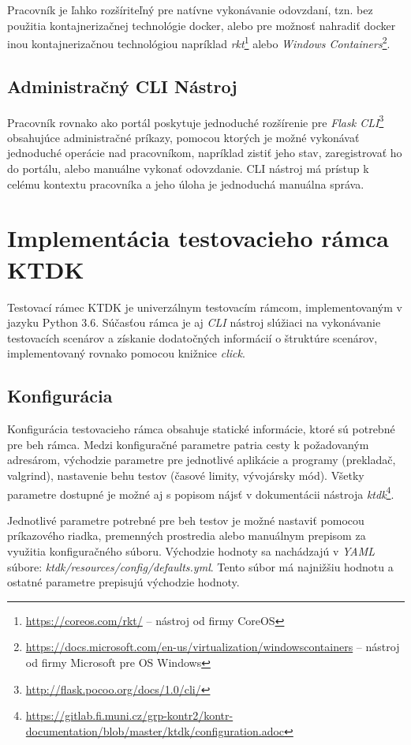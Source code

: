 \documentclass[
  digital, %
  twoside, %
  table,   %
  lof,     %
  lot,     %
]{fithesis3}
\begin{document}
Pracovník je ľahko rozšíriteľný pre natívne vykonávanie odovzdaní, tzn. bez použitia kontajnerizačnej technológie docker, alebo pre možnosť nahradiť docker inou kontajnerizačnou technológiou napríklad \emph{rkt}\footnote{\url{https://coreos.com/rkt/} -- nástroj od firmy CoreOS} alebo \emph{Windows Containers}\footnote{\url{https://docs.microsoft.com/en-us/virtualization/windowscontainers} -- nástroj od firmy Microsoft pre OS Windows}.

\subsection{Administračný CLI Nástroj}

Pracovník rovnako ako portál poskytuje jednoduché rozšírenie pre \emph{Flask CLI}\footnote{\url{http://flask.pocoo.org/docs/1.0/cli/}} obsahujúce administračné príkazy, pomocou ktorých je možné vykonávať jednoduché operácie nad pracovníkom, napríklad zistiť jeho stav, zaregistrovať ho do portálu, alebo manuálne vykonať odovzdanie. CLI nástroj má prístup k celému kontextu pracovníka a jeho úloha je jednoduchá manuálna správa.


\section{Implementácia testovacieho rámca KTDK}

Testovací rámec KTDK je univerzálnym testovacím rámcom, implementovaným v jazyku Python 3.6. Súčasťou rámca je aj \emph{CLI} nástroj slúžiaci na vykonávanie testovacích scenárov a získanie dodatočných informácií o štruktúre scenárov, implementovaný rovnako pomocou knižnice \emph{click}.

\subsection{Konfigurácia}

Konfigurácia testovacieho rámca obsahuje statické informácie, ktoré sú potrebné pre beh rámca. Medzi konfiguračné parametre patria cesty k požadovaným adresárom,
východzie parametre pre jednotlivé aplikácie a programy (prekladač, valgrind), nastavenie behu testov (časové limity, vývojársky mód). Všetky parametre dostupné je možné aj s popisom nájsť v dokumentácii nástroja \emph{ktdk}\footnote{\url{https://gitlab.fi.muni.cz/grp-kontr2/kontr-documentation/blob/master/ktdk/configuration.adoc}}.

Jednotlivé parametre potrebné pre beh testov je možné nastaviť pomocou príkazového riadka, premenných prostredia alebo manuálnym prepisom za využitia konfiguračného súboru. Východzie hodnoty sa nachádzajú v \emph{YAML} súbore: \emph{ktdk/resources/config/defaults.yml}. Tento súbor má najnižšiu hodnotu a ostatné parametre prepisujú východzie hodnoty. 
\end{document}

